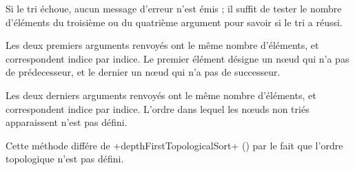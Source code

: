 Si le tri échoue, aucun message d'erreur n'est émis ; il suffit de tester le nombre d'éléments du troisième ou du quatrième argument pour savoir si le tri a réussi.

Les deux premiers arguments renvoyés ont le même nombre d'éléments, et correspondent indice par indice. Le premier élément désigne un nœud qui n'a pas de prédecesseur, et le dernier un nœud qui n'a pas de successeur.


Les deux derniers arguments renvoyés ont le même nombre d'éléments, et correspondent indice par indice. L'ordre dans lequel les nœuds non triés apparaissent n'est pas défini.

Cette méthode différe de \ggs+depthFirstTopologicalSort+ () par le fait que  l'ordre topologique n'est pas défini.
